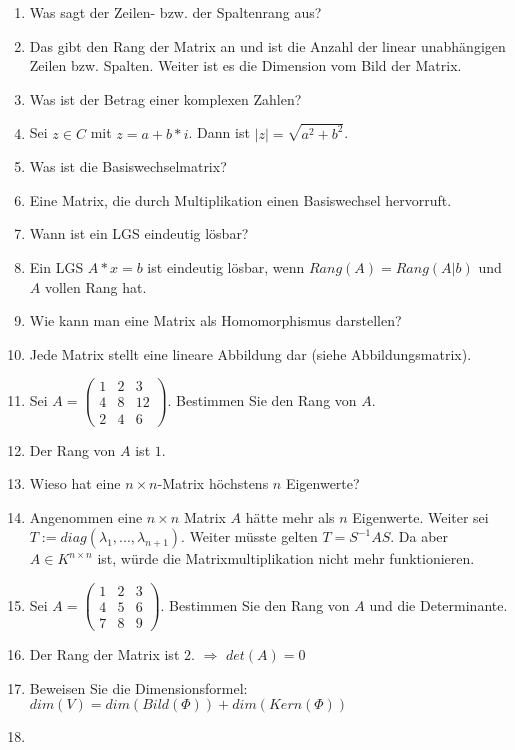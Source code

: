 \documentclass[11pt,parskip=full]{scrartcl}
\newcommand{\answer}{\item[\textbf{Antwort}]}
\begin{document}
\begin{enumerate}[label=\textbf{\arabic*. Frage}]
		\item Was sagt der Zeilen- bzw. der Spaltenrang aus?
		\answer Das gibt den Rang der Matrix an und ist die Anzahl der linear unabhängigen Zeilen bzw. Spalten. Weiter ist es die Dimension vom Bild der Matrix.
		
		\item Was ist der Betrag einer komplexen Zahlen?
		\answer Sei \(z \in C\) mit \(z = a+b*i\). Dann ist \(|z|= \sqrt{a^2+b^2}\).
		
		\item Was ist die Basiswechselmatrix?
		\answer Eine Matrix, die durch Multiplikation einen Basiswechsel hervorruft.
		
		\item Wann ist ein LGS eindeutig lösbar?
		\answer Ein LGS \(A*x=b\) ist eindeutig lösbar, wenn \(Rang(A)=Rang(A|b)\) und $A$ vollen Rang hat.
		
		\item Wie kann man eine Matrix als Homomorphismus darstellen?
		\answer Jede Matrix stellt eine lineare Abbildung dar (siehe Abbildungsmatrix).
		
		\item Sei \(A =
		\begin{pmatrix}
		1 & 2 & 3 \\
		4 & 8 & 12 \\
		2 & 4 & 6
		\end{pmatrix}\). Bestimmen Sie den Rang von $A$.
		\answer Der Rang von $A$ ist $1$. 
		
		\item Wieso hat eine \(n \times n\)-Matrix höchstens $n$ Eigenwerte?
		\answer Angenommen eine \(n \times n\) Matrix $A$ hätte mehr als $n$ Eigenwerte. Weiter sei \(T := diag(\lambda_1, ..., \lambda_{n+1})\). Weiter müsste gelten \(T = S^{-1}AS\). Da aber \(A \in K^{n \times n}\) ist, würde die Matrixmultiplikation nicht mehr funktionieren.
		
		\item Sei \(A =
		\begin{pmatrix}
		1 & 2 & 3 \\
		4 & 5 & 6 \\
		7 & 8 & 9
		\end{pmatrix}\). Bestimmen Sie den Rang von $A$ und die Determinante.
		\answer Der Rang der Matrix ist $2$. $\Rightarrow$ \(det(A) = 0\)
		
		\item Beweisen Sie die Dimensionsformel: \(dim(V) = dim(Bild(\Phi)) + dim(Kern(\Phi))\)
		\answer 
		

\end{enumerate}
\end{document}
